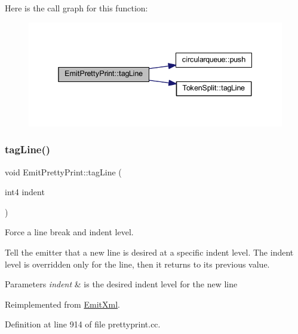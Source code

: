 Here is the call graph for this function\+:
\nopagebreak
\begin{figure}[H]
\begin{center}
\leavevmode
\includegraphics[width=338pt]{class_emit_pretty_print_a986da682a9a028e8cf7ee8162f941014_cgraph}
\end{center}
\end{figure}
\mbox{\label{class_emit_pretty_print_a9e14af0674eafd65ffdee52380944347}} 
\subsubsection{\texorpdfstring{tagLine()}{tagLine()}\hspace{0.1cm}{\footnotesize\ttfamily [2/2]}}
{\footnotesize\ttfamily void Emit\+Pretty\+Print\+::tag\+Line (\begin{DoxyParamCaption}\item[{int4}]{indent }\end{DoxyParamCaption})\hspace{0.3cm}{\ttfamily [virtual]}}



Force a line break and indent level. 

Tell the emitter that a new line is desired at a specific indent level. The indent level is overridden only for the line, then it returns to its previous value. 
\begin{DoxyParams}{Parameters}
{\em indent} & is the desired indent level for the new line \\
\hline
\end{DoxyParams}


Reimplemented from \mbox{\hyperlink{class_emit_xml_afb2b27a85e75136cf66d143d2dd502ae}{Emit\+Xml}}.



Definition at line 914 of file prettyprint.\+cc.

